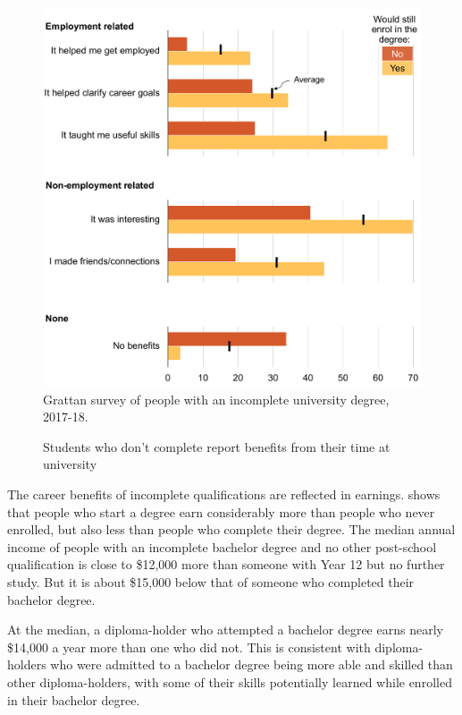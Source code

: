                \begin{figure}
                    \caption{Students who don't complete report benefits from their time at university\label{fig:9}}%
                    \includegraphics[page=1]{atlas/benefits_halfpage.pdf} 
                    {Grattan survey of people with an incomplete university degree, 2017-18.}
                \end{figure}


The career benefits of incomplete qualifications are reflected in earnings.  shows that people who start a degree earn considerably more than people who never enrolled, but also less than people who complete their degree. The median annual income of people with an incomplete bachelor degree and no other post-school qualification is close to \$12,000 more than someone with Year 12 but no further study. But it is about \$15,000 below that of someone who completed their bachelor degree.

At the median, a diploma-holder who attempted a bachelor degree earns nearly \$14,000 a year more than one who did not. This is consistent with diploma-holders who were admitted to a bachelor degree being more able and skilled than other diploma-holders, with some of their skills potentially learned while enrolled in their bachelor degree.

